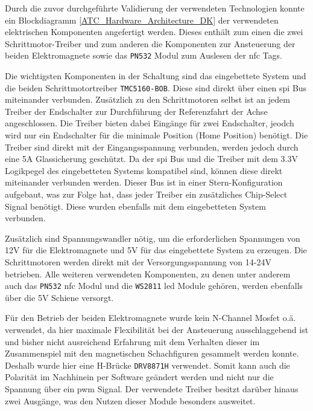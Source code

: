 Durch die zuvor durchgeführte Validierung der verwendeten Technologien
konnte ein Blockdiagramm \ref{ATC_Hardware_Architecture_DK} der
verwendeten elektrischen Komponenten angefertigt werden. Dieses enthält
zum einen die zwei Schrittmotor-Treiber und zum anderen die Komponenten
zur Ansteuerung der beiden Elektromagnete sowie das
\passthrough{\lstinline!PN532!} Modul zum Auslesen der \gls{nfc} Tags.

Die wichtigsten Komponenten in der Schaltung sind das eingebettete
System und die beiden Schrittmotortreiber
\passthrough{\lstinline!TMC5160-BOB!}. Diese sind direkt über einen
\gls{spi} Bus miteinander verbunden. Zusätzlich zu den Schrittmotoren
selbst ist an jedem Treiber der Endschalter zur Durchführung der
Referenzfahrt der Achse angeschlossen. Die Treiber bieten dabei Eingänge
für zwei Endschalter, jeodch wird nur ein Endschalter für die minimale
Position (Home Position) benötigt. Die Treiber sind direkt mit der
Eingangsspannung verbunden, werden jedoch durch eine 5A Glassicherung
geschützt. Da der \gls{spi} Bus und die Treiber mit dem 3.3V Logikpegel
des eingebetteten Systems kompatibel sind, können diese direkt
miteinander verbunden werden. Dieser Bus ist in einer
Stern-Konfiguration aufgebaut, was zur Folge hat, dass jeder Treiber ein
zusätzliches Chip-Select Signal benötigt. Diese wurden ebenfalls mit dem
eingebetteten System verbunden.

Zusätzlich sind Spannungswandler nötig, um die erforderlichen Spannungen
von 12V für die Elektromagnete und 5V für das eingebettete System zu
erzeugen. Die Schrittmotoren werden direkt mit der Versorgungsspannung
von 14-24V betrieben. Alle weiteren verwendeten Komponenten, zu denen
unter anderem auch das \passthrough{\lstinline!PN532!} \gls{nfc} Modul
und die \passthrough{\lstinline!WS2811!} \gls{led} Module gehören,
werden ebenfalls über die 5V Schiene versorgt.

Für den Betrieb der beiden Elektromagnete wurde kein N-Channel Mosfet
o.ä. verwendet, da hier maximale Flexibilität bei der Ansteuerung
ausschlaggebend ist und bisher nicht ausreichend Erfahrung mit dem
Verhalten dieser im Zusammenspiel mit den magnetischen Schachfiguren
gesammelt werden konnte. Deshalb wurde hier eine H-Brücke
\passthrough{\lstinline!DRV8871H!} verwendet. Somit kann auch die
Polarität im Nachhinein per Software geändert werden und nicht nur die
Spannung über ein \gls{pwm} Signal. Der verwendete Treiber besitzt
darüber hinaus zwei Ausgänge, was den Nutzen dieser Module besonders
ausweitet.

